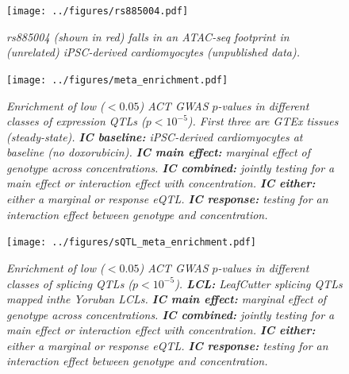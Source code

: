\documentclass{article}
\begin{document}
\begin{figure}[h]
\begin{center}
    \texttt{[image: ../figures/rs885004.pdf]} %
    \caption{\it{rs885004 (shown in red) falls in an ATAC-seq footprint in (unrelated) iPSC-derived cardiomyocytes (unpublished data).}}
    \label{fig:rs885004}
    \end{center}
\end{figure}

\begin{figure}[h]
\begin{center}
    \texttt{[image: ../figures/meta\_enrichment.pdf]} 
    \caption{\it{Enrichment of low ($<0.05$) ACT GWAS $p$-values in different classes of expression QTLs ($p < 10^{-5}$). First three are GTEx tissues (steady-state). \textbf{IC baseline:} iPSC-derived cardiomyocytes at baseline (no doxorubicin). \textbf{IC main effect:} marginal effect of genotype across concentrations. \textbf{IC combined:} jointly testing for a main effect or interaction effect with concentration. \textbf{IC either:} either a marginal or response eQTL. \textbf{IC response:} testing for an interaction effect between genotype and concentration.}}
    \label{fig:meta_enrichment}
    \end{center}
\end{figure}

\begin{figure}[h]
\begin{center}
    \texttt{[image: ../figures/sQTL\_meta\_enrichment.pdf]} 
    \caption{\it{Enrichment of low ($<0.05$) ACT GWAS $p$-values in different classes of splicing QTLs ($p < 10^{-5}$). \textbf{LCL:} LeafCutter splicing QTLs mapped inthe Yoruban LCLs\cite{li2016rna}. \textbf{IC main effect:} marginal effect of genotype across concentrations. \textbf{IC combined:} jointly testing for a main effect or interaction effect with concentration. \textbf{IC either:} either a marginal or response eQTL. \textbf{IC response:} testing for an interaction effect between genotype and concentration.}}
    \label{fig:sQTL_meta_enrichment}
    \end{center}
\end{figure}
\end{document}
